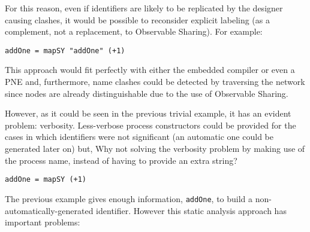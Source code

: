 \documentclass[a4paper,twoside,11pt]{article}
\begin{document}
For this reason, even if identifiers are likely to be replicated by the
designer causing clashes, it would be possible to reconsider explicit
labeling (as a complement, not a replacement, to Observable Sharing).
For example:


\begin{verbatim}
addOne = mapSY "addOne" (+1)
\end{verbatim}

This approach would fit perfectly with either the embedded compiler or even a
PNE and, furthermore, name clashes could be detected by traversing the network
since nodes are already distinguishable due to the use of Observable Sharing.

However, as it could be seen in the previous trivial example, it has an
evident problem: verbosity. Less-verbose process constructors could be
provided for the cases in which identifiers were not significant (an automatic
one could be generated later on) but, Why not solving the verbosity problem by
making use of the process name, instead of having to provide an extra string?

\begin{verbatim}
addOne = mapSY (+1)
\end{verbatim}

The previous example gives enough information, \texttt{addOne}, to build a
non-automatically-generated identifier. However this static analysis approach
has important problems:
\end{document}
